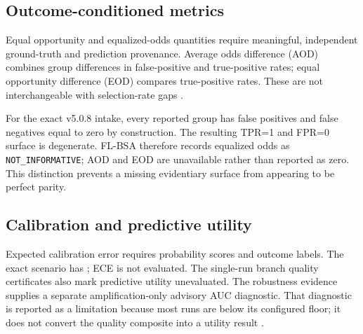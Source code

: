 \subsection{Outcome-conditioned metrics}

Equal opportunity and equalized-odds quantities require meaningful, independent ground-truth and prediction
provenance. Average odds difference (AOD) combines group differences in false-positive and
true-positive rates; equal opportunity difference (EOD) compares true-positive rates. These are
not interchangeable with selection-rate gaps \citep{hardt2016equality}.

For the exact v5.0.8 intake, every reported group has false positives and false negatives equal to
zero by construction. The resulting TPR=1 and FPR=0 surface is degenerate. FL-BSA therefore records
equalized odds as \texttt{NOT\_INFORMATIVE}; AOD and EOD are unavailable rather than reported as
zero. This distinction prevents a missing evidentiary surface from appearing to be perfect parity.

\subsection{Calibration and predictive utility}

Expected calibration error requires probability scores and outcome labels. The exact scenario has
; ECE is not evaluated. The single-run branch quality certificates also
mark predictive utility unevaluated. The robustness evidence supplies a separate amplification-only
advisory AUC diagnostic. That diagnostic is reported as a limitation because most runs are below its
configured floor; it does not convert the quality composite into a utility result
\citep{guo2017calibration,fawcett2006roc}.
